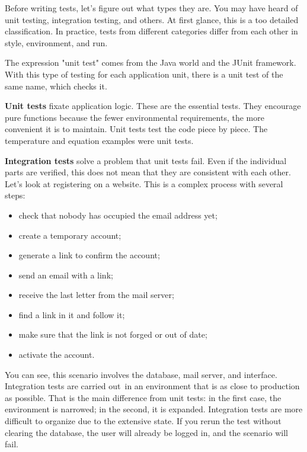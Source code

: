 
Before writing tests, let's figure out what types they are. You may have heard of unit testing, integration testing, and others. At first glance, this is a too detailed classification. In practice, tests from different categories differ from each other in style, environment, and run.

The expression "unit test" comes from the Java world and the JUnit framework. With this type of testing for each application unit, there is a unit test of the same name, which checks it.

\textbf{Unit tests} fixate application logic. These are the essential tests. They encourage pure functions because the fewer environmental requirements, the more convenient it is to maintain. Unit tests test the code piece by piece. The temperature and equation examples were unit tests.


\textbf{Integration tests} solve a problem that unit tests fail. Even if the individual parts are verified, this does not mean that they are consistent with each other. Let's look at registering on a website. This is a complex process with several steps:

\begin{itemize}

\item
  check that nobody has occupied the email address yet;

\item
  create a temporary account;

\item
  generate a link to confirm the account;

\item
  send an email with a link;

\item
  receive the last letter from the mail server;

\item
  find a link in it and follow it;

\item
  make sure that the link is not forged or out of date;

\item
  activate the account.

\end{itemize}

You can see, this scenario involves the database, mail server, and interface. Integration tests are carried out in an environment that is as close to production as possible. That is the main difference from unit tests: in the first case, the environment is narrowed; in the second, it is expanded. Integration tests are more difficult to organize due to the extensive state. If you rerun the test without clearing the database, the user will already be logged in, and the scenario will fail.

